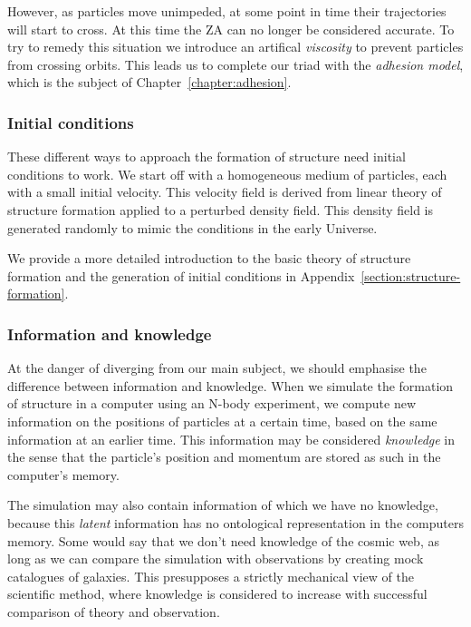 However, as particles move unimpeded, at some point in time their trajectories will start to cross. At this time the \ac{ZA} can no longer be considered accurate. To try to remedy this situation we introduce an artifical \emph{viscosity} to prevent particles from crossing orbits. This leads us to complete our triad with the \emph{adhesion model}, which is the subject of Chapter~\ref{chapter:adhesion}.

\subsubsection{Initial conditions}
These different ways to approach the formation of structure need initial conditions to work. We start off with a homogeneous medium of particles, each with a small initial velocity. This velocity field is derived from linear theory of structure formation applied to a perturbed density field. This density field is generated randomly to mimic the conditions in the early Universe.

We provide a more detailed introduction to the basic theory of structure formation and the generation of initial conditions in Appendix~\ref{section:structure-formation}.

\subsubsection{Information and knowledge}
At the danger of diverging from our main subject, we should emphasise the difference between information and knowledge. When we simulate the formation of structure in a computer using an N-body experiment, we compute new information on the positions of particles at a certain time, based on the same information at an earlier time. This information may be considered \emph{knowledge} in the sense that the particle's position and momentum are stored as such in the computer's memory.


The simulation may also contain information of which we have no knowledge, because this \emph{latent} information has no ontological representation in the computers memory.
Some would say that we don't need knowledge of the cosmic web, as long as we can compare the simulation with observations by creating mock catalogues of galaxies. This presupposes a strictly mechanical view of the scientific method, where knowledge is considered to increase with successful comparison of theory and observation.

